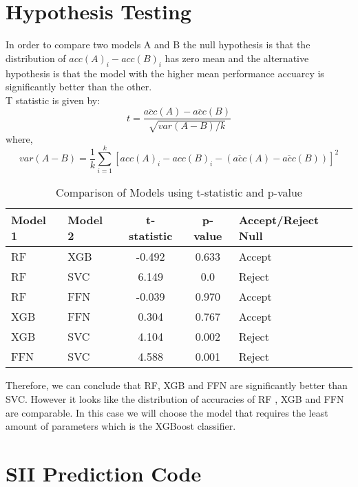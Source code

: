 \begin{appendices}
    \pagebreak
    \section{Hypothesis Testing}
    In order to compare two models A and B the null hypothesis is that the distribution of $acc(A)_i - acc(B)_i$ has zero mean and the alternative hypothesis is that the model with the higher mean performance accuarcy is significantly better than the other.\\
    T statistic is given by:
        \[
        t = \frac{\overline{acc}(A) - \overline{acc}(B)}{\sqrt{var(A - B)/k}}
        \]
        where,
        \[
        var(A - B) = \frac{1}{k}\sum_{i=1}^k [acc(A)_i - acc(B)_i - (\overline{acc}(A) - \overline{acc}(B))]^2
        \]

        \begin{table}[h!]
            \centering
            \caption{Comparison of Models using t-statistic and p-value}
            \begin{tabular}{|l|l|c|c|l|}
                \hline
                \textbf{Model 1} & \textbf{Model 2} & \textbf{t-statistic} & \textbf{p-value} & \textbf{Accept/Reject Null} \\
                \hline
                RF & XGB & -0.492 & 0.633 & Accept \\
                \hline
                RF & SVC & 6.149 & 0.0 & Reject \\
                \hline
                RF & FFN & -0.039 & 0.970 & Accept \\
                \hline
                XGB & FFN & 0.304 & 0.767 & Accept \\
                \hline
                XGB & SVC & 4.104 & 0.002 & Reject \\
                \hline
                FFN & SVC & 4.588 & 0.001 & Reject \\
                \hline
            \end{tabular}
        \end{table}
    Therefore, we can conclude that RF, XGB and FFN are significantly better than SVC. 
    However it looks like the distribution of accuracies of RF , XGB and FFN are comparable. 
    In this case we will choose the model that requires the least amount of parameters which is the XGBoost classifier.

    \pagebreak
    \section{SII Prediction Code}
    \begin{mdframed}
    \begin{lstlisting}[breaklines=true]
        
    \end{lstlisting}
    \end{mdframed}
  
\end{appendices}